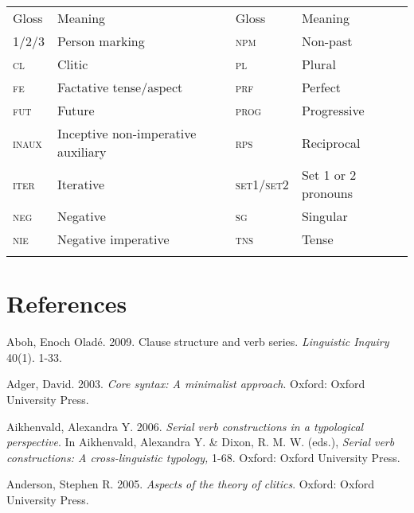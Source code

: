 \begin{tabularx}{\textwidth}{XXXX}
\lsptoprule

{\mdseries Gloss} & {\mdseries Meaning} & {\mdseries Gloss} & {\mdseries Meaning}\\
{\scshape 1/2/3} & {\mdseries Person marking} & {\scshape npm} & {\mdseries Non-past }\\
{\scshape cl} & {\mdseries Clitic} & {\scshape pl} & {\mdseries Plural }\\
{\scshape fe} & {\mdseries Factative tense/aspect} & {\scshape prf} & {\mdseries Perfect }\\
{\scshape fut} & {\mdseries Future} & {\scshape prog} & {\mdseries Progressive}\\
{\scshape inaux} & {\mdseries Inceptive non-imperative auxiliary} & {\scshape rps} & {\mdseries Reciprocal }\\
{\scshape iter} & {\mdseries Iterative} & {\scshape set1/set2} & {\mdseries Set 1 or 2 pronouns}\\
{\scshape neg} & {\mdseries Negative} & {\scshape sg} & {\mdseries Singular }\\
{\scshape nie} & {\mdseries Negative imperative} & {\scshape tns} & {\mdseries Tense }\\
\lspbottomrule
\end{tabularx}
\chapter{References}

\begin{styleNoSpacing}
Aboh, Enoch Oladé. 2009. Clause structure and verb series. \textit{Linguistic Inquiry} 40(1). 1-33.
\end{styleNoSpacing}

\begin{styleNoSpacing}
Adger, David. 2003.\textit{ Core syntax: A minimalist approach}. Oxford: Oxford University Press.
\end{styleNoSpacing}

\begin{styleNoSpacing}
Aikhenvald, Alexandra Y. 2006. \textit{Serial verb constructions in a typological perspective}. In Aikhenvald, Alexandra Y. \& Dixon, R. M. W. (eds.), \textit{Serial verb constructions: A cross-linguistic typology,} 1-68. Oxford: Oxford University Press. 
\end{styleNoSpacing}

\begin{styleNoSpacing}
Anderson, Stephen R. 2005. \textit{Aspects of the theory of clitics}. Oxford: Oxford University Press.
\end{styleNoSpacing}

